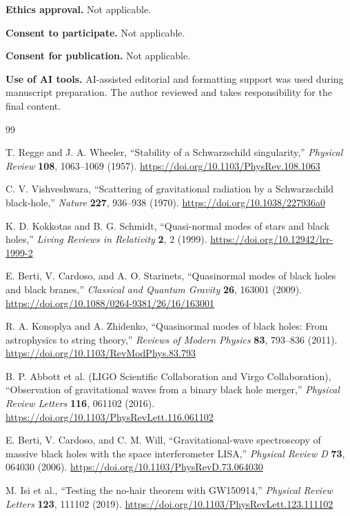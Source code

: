 ﻿\documentclass[12pt,a4paper]{article}
\begin{document}
\noindent\textbf{Ethics approval.}
Not applicable.

\noindent\textbf{Consent to participate.}
Not applicable.

\noindent\textbf{Consent for publication.}
Not applicable.

\noindent\textbf{Use of AI tools.}
AI-assisted editorial and formatting support was used during manuscript preparation.
The author reviewed and takes responsibility for the final content.

\begin{thebibliography}{99}

T. Regge and J. A. Wheeler,
``Stability of a Schwarzschild singularity,''
\emph{Physical Review} \textbf{108}, 1063--1069 (1957).
\url{https://doi.org/10.1103/PhysRev.108.1063}

C. V. Vishveshwara,
``Scattering of gravitational radiation by a Schwarzschild black-hole,''
\emph{Nature} \textbf{227}, 936--938 (1970).
\url{https://doi.org/10.1038/227936a0}

K. D. Kokkotas and B. G. Schmidt,
``Quasi-normal modes of stars and black holes,''
\emph{Living Reviews in Relativity} \textbf{2}, 2 (1999).
\url{https://doi.org/10.12942/lrr-1999-2}

E. Berti, V. Cardoso, and A. O. Starinets,
``Quasinormal modes of black holes and black branes,''
\emph{Classical and Quantum Gravity} \textbf{26}, 163001 (2009).
\url{https://doi.org/10.1088/0264-9381/26/16/163001}

R. A. Konoplya and A. Zhidenko,
``Quasinormal modes of black holes: From astrophysics to string theory,''
\emph{Reviews of Modern Physics} \textbf{83}, 793--836 (2011).
\url{https://doi.org/10.1103/RevModPhys.83.793}

B. P. Abbott et al. (LIGO Scientific Collaboration and Virgo Collaboration),
``Observation of gravitational waves from a binary black hole merger,''
\emph{Physical Review Letters} \textbf{116}, 061102 (2016).
\url{https://doi.org/10.1103/PhysRevLett.116.061102}

E. Berti, V. Cardoso, and C. M. Will,
``Gravitational-wave spectroscopy of massive black holes with the space interferometer LISA,''
\emph{Physical Review D} \textbf{73}, 064030 (2006).
\url{https://doi.org/10.1103/PhysRevD.73.064030}

M. Isi et al.,
``Testing the no-hair theorem with GW150914,''
\emph{Physical Review Letters} \textbf{123}, 111102 (2019).
\url{https://doi.org/10.1103/PhysRevLett.123.111102}


\end{thebibliography}
\end{document}
